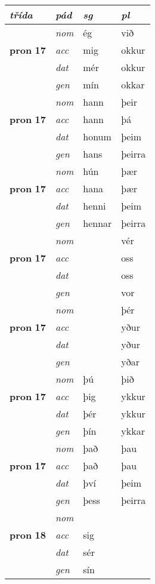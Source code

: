 \begin{longtable}{l>{\footnotesize\itshape}lll}
 {\textbf{\textit{třída}}} & {\textit{pád}}   & \textit{sg} & \textit{pl}  \\ \cmidrule{1-4}
\endhead
\multirow{3}{*}{{{\textbf{pron} \Large{\textbf{17}}}}}  &  nom & ég & við   \\*
 & acc &  mig  & okkur  \\*
 & dat & mér & okkur   \\*
 & gen & mín  & okkar  \\
\cmidrule{2-4}

\multirow{3}{*}{{{\textbf{pron} \Large{\textbf{17}}}}}  &  nom & hann & þeir   \\*
 & acc &  hann  & þá  \\*
 & dat & honum & þeim   \\*
 & gen & hans  & þeirra  \\
\cmidrule{2-4}

\multirow{3}{*}{{{\textbf{pron} \Large{\textbf{17}}}}}  &  nom & hún & þær   \\*
 & acc &  hana  & þær  \\*
 & dat & henni & þeim   \\*
 & gen & hennar  & þeirra  \\
\cmidrule{2-4}

\multirow{3}{*}{{{\textbf{pron} \Large{\textbf{17}}}}}  &  nom &  & vér   \\*
 & acc &    & oss  \\*
 & dat &  & oss   \\*
 & gen &   & vor  \\
\cmidrule{2-4}

\multirow{3}{*}{{{\textbf{pron} \Large{\textbf{17}}}}}  &  nom &  & þér   \\*
 & acc &    & yður  \\*
 & dat &  & yður   \\*
 & gen &   & yðar  \\
\cmidrule{2-4}

\multirow{3}{*}{{{\textbf{pron} \Large{\textbf{17}}}}}  &  nom & þú & þið   \\*
 & acc &  þig  & ykkur  \\*
 & dat & þér & ykkur   \\*
 & gen & þín  & ykkar  \\
\cmidrule{2-4}

\multirow{3}{*}{{{\textbf{pron} \Large{\textbf{17}}}}}  &  nom & það & þau   \\*
 & acc &  það  & þau  \\*
 & dat & því & þeim   \\*
 & gen & þess  & þeirra  \\
\cmidrule{2-4}

\multirow{3}{*}{{{\textbf{pron} \Large{\textbf{18}}}}}  &  nom &  &    \\*
 & acc &  sig  &   \\*
 & dat & sér &    \\*
 & gen & sín  &   \\
\cmidrule{2-4}
\bottomrule
\end{longtable}
